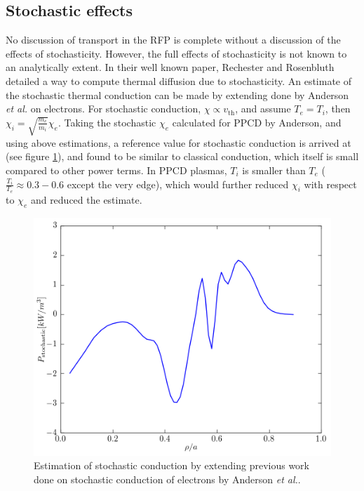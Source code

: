 \begin{refsection}
\subsection{Stochastic effects}\label{sec:stochastic_effects}
No discussion of transport in the RFP is complete without a discussion of the effects of stochasticity. However, the full effects of stochasticity is not known to an analytically extent. In their well known paper, Rechester and Rosenbluth\cite{Rechester1978} detailed a way to compute thermal diffusion due to stochasticity. An estimate of the stochastic thermal conduction can be made by extending done by Anderson \textit{et al.}\cite{Anderson2005} on electrons. For stochastic conduction, $\chi \propto v_{\text{th}}$, and assume $T_e = T_i$, then $\chi_i = \sqrt{\frac{m_e}{m_i}}\chi_e$. Taking the stochastic $\chi_e$ calculated for PPCD by Anderson, and using above estimations, a reference value for stochastic conduction is arrived at (see figure \ref{fig:p_st}), and found to be similar to classical conduction, which itself is small compared to other power terms. In PPCD plasmas, $T_i$ is smaller than $T_e$ ($\frac{T_i}{T_e} \approx 0.3-0.6$ except the very edge), which would further reduced $\chi_i$ with respect to $\chi_e$ and reduced the estimate. 
\begin{figure}[!htb]
	\centering
	\includegraphics[width = 0.75\linewidth]{./transport_modeling/p_st.png}
    \caption[Estimation of stochastic conduction]{Estimation of stochastic conduction by extending previous work done on stochastic conduction of electrons by Anderson \textit{et al.}\cite{Anderson2005}.}
    \label{fig:p_st}
\end{figure}%


\end{refsection}
